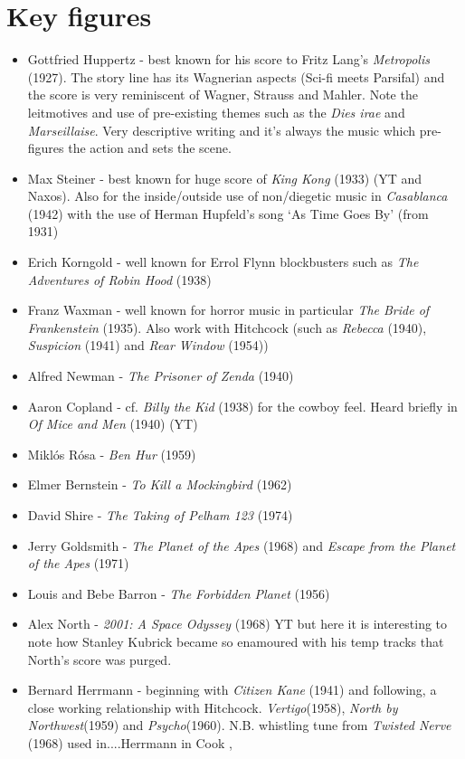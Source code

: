 \section{Key figures}
\begin{itemize}
\item Gottfried Huppertz - best known for his score to Fritz Lang's \textit{Metropolis} (1927). The story line has its Wagnerian aspects (Sci-fi meets Parsifal) and the score is very reminiscent of Wagner, Strauss and Mahler. Note the leitmotives and use of pre-existing themes such as the \textit{Dies irae} and \textit{Marseillaise}. Very descriptive writing and it's always the music which pre-figures the action and sets the scene. 
\item Max Steiner - best known for huge score of \textit{King Kong} (1933) (YT and Naxos). Also for the inside/outside use of non/diegetic music in \textit{Casablanca} (1942) with the use of Herman Hupfeld's song `As Time Goes By' (from 1931) 
\item Erich Korngold - well known for Errol Flynn blockbusters such as \textit{The Adventures of Robin Hood} (1938)
\item Franz Waxman - well known for horror music in particular \textit{The Bride of Frankenstein} (1935). Also work with Hitchcock (such as \textit{Rebecca} (1940), \textit{Suspicion} (1941) and \textit{Rear Window} (1954))
\item Alfred Newman - \textit{The Prisoner of Zenda} (1940)
\item Aaron Copland - cf. \textit{Billy the Kid} (1938) for the cowboy feel. Heard briefly in \textit{Of Mice and Men} (1940) (YT)
\item Mikl\'os R\'osa - \textit{Ben Hur} (1959)
\item Elmer Bernstein - \textit{To Kill a Mockingbird} (1962)
\item David Shire - \textit{The Taking of Pelham 123} (1974)
\item Jerry Goldsmith - \textit{The Planet of the Apes} (1968) and \textit{Escape from the Planet of the Apes} (1971)
\item Louis and Bebe Barron - \textit{The Forbidden Planet} (1956)
\item Alex North - \textit{2001: A Space Odyssey} (1968) YT but here it is interesting to note how Stanley Kubrick became so enamoured with his temp tracks that North's score was purged. 
\item Bernard Herrmann - beginning with \textit{Citizen Kane} (1941) and following, a close working relationship with Hitchcock. \textit{Vertigo}(1958), \textit{North by Northwest}(1959) and \textit{Psycho}(1960). N.B. whistling tune from \textit{Twisted Nerve} (1968) used in....Herrmann in Cook \citep[66]{cook1998analysing},

\end{itemize}
